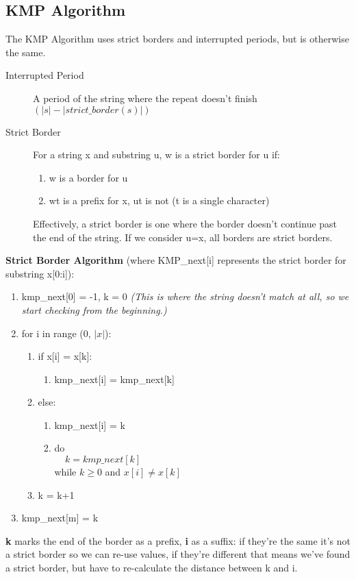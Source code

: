\subsection{KMP Algorithm}
The KMP Algorithm uses strict borders and interrupted periods, but is otherwise the same. 
\begin{description}
    \item[Interrupted Period] A period of the string where the repeat doesn't finish $(|s| - |strict\_border(s)|)$
    \item[Strict Border] For a string x and substring u, w is a strict border for u if:
    \begin{enumerate}
        \item w is a border for u
        \item wt is a prefix for x, ut is not (t is a single character)
    \end{enumerate}
    Effectively, a strict border is one where the border doesn't continue past the end of the string. If we consider u=x, all borders are strict borders. 
\end{description}
\textbf{Strict Border Algorithm} (where KMP\_next[i] represents the strict border for substring x[0:i]):
\begin{enumerate}[label=\Alph*]
    \item kmp\_next[0] = -1, k = 0 \emph{(This is where the string doesn't match at all, so we start checking from the beginning.)}
    \item for i in range (0, $|x|$):
\begin{enumerate}[label=\arabic*]
    \item if x[i] = x[k]: 
    \begin{enumerate}
        \item kmp\_next[i] = kmp\_next[k] 
    \end{enumerate}
    \item else:
    \begin{enumerate}
        \item kmp\_next[i] = k
        \item do\\      
             $\; \; \; \; k = kmp\_next[k]$\\
             while $k\geq 0$ and $x[i]\neq x[k]$    
    \end{enumerate}
    \item k = k+1
\end{enumerate} 
\item kmp\_next[m] = k
\end{enumerate}
\textbf{k} marks the end of the border as a prefix, \textbf{i} as a suffix: if they're the same it's not a strict border so we can re-use values, if they're different that means we've found a strict border, but have to re-calculate the distance between k and i.

